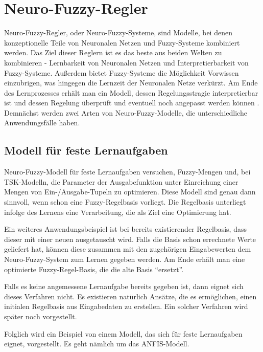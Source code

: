 \section{Neuro-Fuzzy-Regler}

Neuro-Fuzzy-Regler, oder Neuro-Fuzzy-Systeme, sind Modelle, bei denen konzeptionelle Teile von Neuronalen Netzen und Fuzzy-Systeme kombiniert werden. Das Ziel dieser Reglern ist es das beste aus beiden Welten zu kombinieren - Lernbarkeit von Neuronalen Netzen und Interpretierbarkeit von Fuzzy-Systeme. Außerdem bietet Fuzzy-Systeme die Möglichkeit Vorwissen einzubrigen, was hingegen die Lernzeit der Neuronalen Netze verkürzt. Am Ende des Lernprozesses erhält man ein Modell, dessen Regelungsstragie interpretierbar ist und dessen Regelung überprüft und eventuell noch angepasst werden können \cite{CIKruse:15}. Demnächst werden zwei Arten von Neuro-Fuzzy-Modelle, die unterschiedliche Anwendungsfälle haben.

\subsection{Modell f\"{u}r feste Lernaufgaben}

Neuro-Fuzzy-Modell für feste Lernaufgaben versuchen, Fuzzy-Mengen und, bei TSK-Modelln, die Parameter der Ausgabefunktion unter Einreichung einer Mengen von Ein-/Ausgabe-Tupeln zu optimieren. Diese Modell sind genau dann sinnvoll, wenn schon eine Fuzzy-Regelbasis vorliegt. Die Regelbasis unterliegt infolge des Lernens eine Verarbeitung, die als Ziel eine Optimierung hat. %

Ein weiteres Anwendungsbeispiel ist bei bereits existierender Regelbasis, dass dieser mit einer neuen ausgetauscht wird. Falls die Basis schon errechnete Werte geliefert hat, können diese zusammen mit den zugehörigen Eingabewerten dem Neuro-Fuzzy-System zum Lernen gegeben werden. Am Ende erhält man eine optimierte Fuzzy-Regel-Basis, die die alte Basis ``ersetzt''.

Falls es keine angemessene Lernaufgabe bereits gegeben ist, dann eignet sich dieses Verfahren nicht. Es existieren natürlich Ansätze, die es ermöglichen, einen initialen Regelbasis aus Eingabedaten zu erstellen. Ein solcher Verfahren wird später noch vorgestellt.

Folglich wird ein Beispiel von einem Modell, das sich für feste Lernaufgaben eignet, vorgestellt. Es geht nämlich um das ANFIS-Modell.

